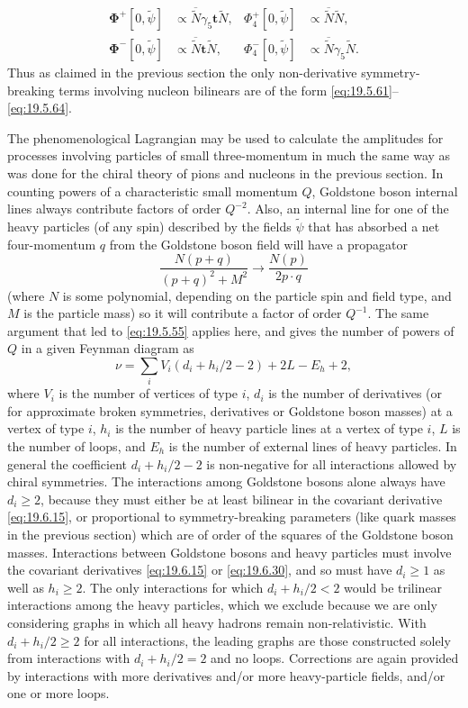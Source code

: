 \[
\begin{aligned}
\boldsymbol\Phi^+[0,\widetilde\psi]
&\propto\overline{\widetilde N}\gamma_5\boldsymbol t\widetilde N,
&
\Phi_4^+[0,\widetilde\psi]
&\propto\overline{\widetilde N}\widetilde N,
\\
\boldsymbol\Phi^-[0,\widetilde\psi]
&\propto\overline{\widetilde N}\boldsymbol t\widetilde N,
&
\Phi_4^-[0,\widetilde\psi]
&\propto\overline{\widetilde N}\gamma_5\widetilde N.
\end{aligned}
\]
Thus as claimed in the previous section the only non-derivative symmetry-breaking terms involving nucleon bilinears are of the form \eqref{eq:19.5.61}--\eqref{eq:19.5.64}.

The phenomenological Lagrangian may be used to calculate the amplitudes for processes involving particles of small three-momentum in much the same way as was done for the chiral theory of pions and nucleons in the previous section. In counting powers of a characteristic small momentum $Q$, Goldstone boson internal lines always contribute factors of order $Q^{-2}$. Also, an internal line for one of the heavy particles (of any spin) described by the fields $\widetilde\psi$ that has absorbed a net four-momentum $q$ from the Goldstone boson field will have a propagator
\[
\frac{N(p+q)}{(p+q)^2+M^2}
\longrightarrow\frac{N(p)}{2p\cdot q}
\]
(where $N$ is some polynomial, depending on the particle spin and field type, and $M$ is the particle mass) so it will contribute a factor of order $Q^{-1}$. The same argument that led to \eqref{eq:19.5.55} applies here, and gives the number of powers of $Q$ in a given Feynman diagram as
\begin{equation}
\nu=\sum_iV_i(d_i+h_i/2-2)+2L-E_h+2,
\tag{19.6.45}\label{eq:19.6.45}
\end{equation}
where $V_i$ is the number of vertices of type $i$, $d_i$ is the number of derivatives (or for approximate broken symmetries, derivatives or Goldstone boson masses) at a vertex of type $i$, $h_i$ is the number of heavy particle lines at a vertex of type $i$, $L$ is the number of loops, and $E_h$ is the number of external lines of heavy particles. In general the coefficient $d_i+h_i/2-2$ is non-negative for all interactions allowed by chiral symmetries. The interactions among Goldstone bosons alone always have $d_i\geq2$, because they must either be at least bilinear in the covariant derivative \eqref{eq:19.6.15}, or proportional to symmetry-breaking parameters (like quark masses in the previous section) which are of order of the squares of the Goldstone boson masses. Interactions between Goldstone bosons and heavy particles must involve the covariant derivatives \eqref{eq:19.6.15} or \eqref{eq:19.6.30}, and so must have $d_i\geq1$ as well as $h_i\geq2$. The only interactions for which $d_i+h_i/2<2$ would be trilinear interactions among the heavy particles, which we exclude because we are only considering graphs in which all heavy hadrons remain non-relativistic. With $d_i+h_i/2\geq2$ for all interactions, the leading graphs are those constructed solely from interactions with $d_i+h_i/2=2$ and no loops. Corrections are again provided by interactions with more derivatives and/or more heavy-particle fields, and/or one or more loops.

